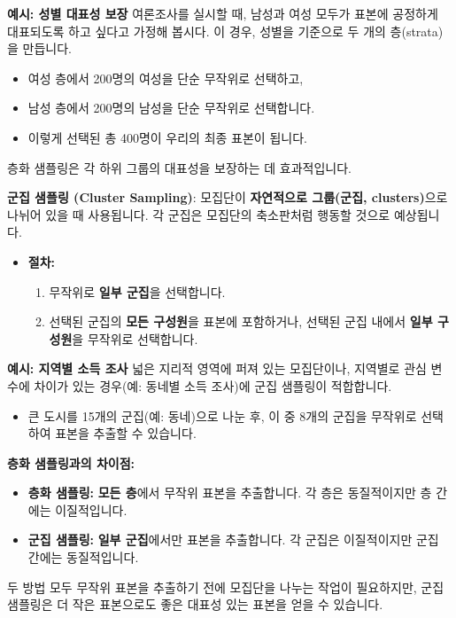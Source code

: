 \documentclass[11pt,a4paper]{book}
\newcommand{\concept}[1]{\textbf{#1}}
\theoremstyle{definition}
\begin{document}
\begin{examplebox}
\textbf{예시: 성별 대표성 보장}
여론조사를 실시할 때, 남성과 여성 모두가 표본에 공정하게 대표되도록 하고 싶다고 가정해 봅시다. 이 경우, 성별을 기준으로 두 개의 층(strata)을 만듭니다.
\begin{itemize}
    \item 여성 층에서 200명의 여성을 단순 무작위로 선택하고,
    \item 남성 층에서 200명의 남성을 단순 무작위로 선택합니다.
    \item 이렇게 선택된 총 400명이 우리의 최종 표본이 됩니다.
\end{itemize}
층화 샘플링은 각 하위 그룹의 대표성을 보장하는 데 효과적입니다.
\end{examplebox}

\begin{tcolorbox}[infobox, title={확률 샘플링 기법 (3/3): 군집 샘플링 (Cluster Sampling)}]
\concept{군집 샘플링 (Cluster Sampling)}: 모집단이 \textbf{자연적으로 그룹(군집, clusters)}으로 나뉘어 있을 때 사용됩니다. 각 군집은 모집단의 축소판처럼 행동할 것으로 예상됩니다.
\begin{itemize}
    \item \textbf{절차:}
    \begin{enumerate}
        \item 무작위로 \textbf{일부 군집}을 선택합니다.
        \item 선택된 군집의 \textbf{모든 구성원}을 표본에 포함하거나, 선택된 군집 내에서 \textbf{일부 구성원}을 무작위로 선택합니다.
    \end{enumerate}
\end{itemize}
\end{tcolorbox}

\begin{examplebox}
\textbf{예시: 지역별 소득 조사}
넓은 지리적 영역에 퍼져 있는 모집단이나, 지역별로 관심 변수에 차이가 있는 경우(예: 동네별 소득 조사)에 군집 샘플링이 적합합니다.
\begin{itemize}
    \item 큰 도시를 15개의 군집(예: 동네)으로 나눈 후, 이 중 8개의 군집을 무작위로 선택하여 표본을 추출할 수 있습니다.
\end{itemize}
\textbf{층화 샘플링과의 차이점:}
\begin{itemize}
    \item \textbf{층화 샘플링:} \textbf{모든 층}에서 무작위 표본을 추출합니다. 각 층은 동질적이지만 층 간에는 이질적입니다.
    \item \textbf{군집 샘플링:} \textbf{일부 군집}에서만 표본을 추출합니다. 각 군집은 이질적이지만 군집 간에는 동질적입니다.
\end{itemize}
두 방법 모두 무작위 표본을 추출하기 전에 모집단을 나누는 작업이 필요하지만, 군집 샘플링은 더 작은 표본으로도 좋은 대표성 있는 표본을 얻을 수 있습니다.
\end{examplebox}
\end{document}
